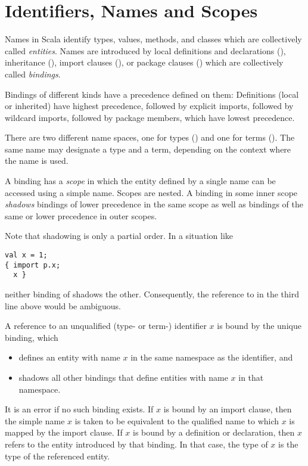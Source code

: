 \chapter{\label{sec:names}Identifiers, Names and Scopes}

Names in Scala identify types, values, methods, and classes which are
collectively called {\em entities}. Names are introduced by local
definitions and declarations (), inheritance (),
import clauses (), or package clauses
() which are collectively called {\em
bindings}.

Bindings of different kinds have a precedence defined on them:
Definitions (local or inherited) have highest precedence, followed by
explicit imports, followed by wildcard imports, followed by package
members, which have lowest precedence.

There are two different name spaces, one for types ()
and one for terms ().  The same name may designate a
type and a term, depending on the context where the name is used.

A binding has a {\em scope} in which the entity defined by a single
name can be accessed using a simple name. Scopes are nested.  A binding
in some inner scope {\em shadows} bindings of lower precedence in the
same scope as well as bindings of the same or lower precedence in outer
scopes. 

Note that shadowing is only a partial order. In a situation like
\begin{lstlisting}
val x = 1;
{ import p.x; 
  x }
\end{lstlisting}
neither binding of  shadows the other. Consequently, the
reference to  in the third line above would be ambiguous.

A reference to an unqualified (type- or term-) identifier $x$ is bound
by the unique binding, which
\begin{itemize}
\item defines an entity with name $x$ in the same namespace as the
identifier, and
\item shadows all other bindings that define entities with name $x$ in that namespace.
\end{itemize}
It is an error if no such binding exists.  If $x$ is bound by an
import clause, then the simple name $x$ is taken to be equivalent to
the qualified name to which $x$ is mapped by the import clause. If $x$
is bound by a definition or declaration, then $x$ refers to the entity
introduced by that binding. In that case, the type of $x$ is the type
of the referenced entity.

